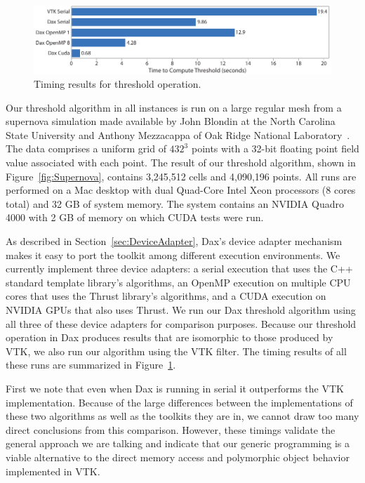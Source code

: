 \documentclass[conference]{IEEEtran}
\newcommand*{\lcite}[1]{~\cite{#1}}
\begin{document}
\begin{figure}
  \centering
  \includegraphics[width=\linewidth]{images/ThresholdTiming}
  \caption{Timing results for threshold operation.}
  \label{fig:Timing}
\end{figure}

Our threshold algorithm in all instances is run on a large regular mesh
from a supernova simulation made available by John Blondin at the North
Carolina State University and Anthony Mezzacappa of Oak Ridge National
Laboratory\lcite{Blondin2003}.  The data comprises a uniform grid of
$432^3$ points with a 32-bit floating point field value associated with
each point.  The result of our threshold algorithm, shown in
Figure~\ref{fig:Supernova}, contains 3,245,512 cells and 4,090,196 points.
All runs are performed on a Mac desktop with dual Quad-Core Intel Xeon
processors (8 cores total) and 32 GB of system memory.  The system contains
an NVIDIA Quadro 4000 with 2 GB of memory on which CUDA tests were run.

As described in Section~\ref{sec:DeviceAdapter}, Dax's device adapter
mechanism makes it easy to port the toolkit among different execution
environments.  We currently implement three device adapters: a serial
execution that uses the C++ standard template library's algorithms, an
OpenMP execution on multiple CPU cores that uses the Thrust library's
algorithms, and a CUDA execution on NVIDIA GPUs that also uses Thrust.  We
run our Dax threshold algorithm using all three of these device adapters
for comparison purposes.  Because our threshold operation in Dax produces
results that are isomorphic to those produced by VTK, we also run our
algorithm using the VTK filter.  The timing results of all these runs are
summarized in Figure~\ref{fig:Timing}.

First we note that even when Dax is running in serial it outperforms the
VTK implementation.  Because of the large differences between the
implementations of these two algorithms as well as the toolkits they are
in, we cannot draw too many direct conclusions from this comparison.
However, these timings validate the general approach we are talking and
indicate that our generic programming is a viable alternative to the direct
memory access and polymorphic object behavior implemented in VTK.
\end{document}
